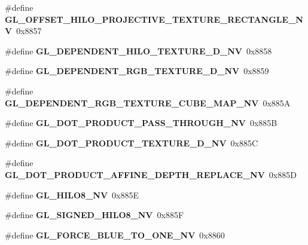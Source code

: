 \begin{DoxyCompactItemize}
\item 
\#define {\bfseries G\+L\+\_\+\+O\+F\+F\+S\+E\+T\+\_\+\+H\+I\+L\+O\+\_\+\+P\+R\+O\+J\+E\+C\+T\+I\+V\+E\+\_\+\+T\+E\+X\+T\+U\+R\+E\+\_\+\+R\+E\+C\+T\+A\+N\+G\+L\+E\+\_\+\+N\+V}~0x8857\label{_s_d_l__opengl_8h_ac6168ab85ff8ca2b666750781a2b4584}

\item 
\#define {\bfseries G\+L\+\_\+\+D\+E\+P\+E\+N\+D\+E\+N\+T\+\_\+\+H\+I\+L\+O\+\_\+\+T\+E\+X\+T\+U\+R\+E\+\_\+D\+\_\+\+N\+V}~0x8858\label{_s_d_l__opengl_8h_ac807d06fb2e5e3a201e61c96e548dd96}

\item 
\#define {\bfseries G\+L\+\_\+\+D\+E\+P\+E\+N\+D\+E\+N\+T\+\_\+\+R\+G\+B\+\_\+\+T\+E\+X\+T\+U\+R\+E\+\_\+D\+\_\+\+N\+V}~0x8859\label{_s_d_l__opengl_8h_a6d8e9d9c65f230d02084520861025af2}

\item 
\#define {\bfseries G\+L\+\_\+\+D\+E\+P\+E\+N\+D\+E\+N\+T\+\_\+\+R\+G\+B\+\_\+\+T\+E\+X\+T\+U\+R\+E\+\_\+\+C\+U\+B\+E\+\_\+\+M\+A\+P\+\_\+\+N\+V}~0x885\+A\label{_s_d_l__opengl_8h_ab764558a3e9b953cebbb17fca92cf78e}

\item 
\#define {\bfseries G\+L\+\_\+\+D\+O\+T\+\_\+\+P\+R\+O\+D\+U\+C\+T\+\_\+\+P\+A\+S\+S\+\_\+\+T\+H\+R\+O\+U\+G\+H\+\_\+\+N\+V}~0x885\+B\label{_s_d_l__opengl_8h_a0b09d6599a6e9407f384a604846af3fa}

\item 
\#define {\bfseries G\+L\+\_\+\+D\+O\+T\+\_\+\+P\+R\+O\+D\+U\+C\+T\+\_\+\+T\+E\+X\+T\+U\+R\+E\+\_\+D\+\_\+\+N\+V}~0x885\+C\label{_s_d_l__opengl_8h_ac67bd7dbb1176479222329103f6ca129}

\item 
\#define {\bfseries G\+L\+\_\+\+D\+O\+T\+\_\+\+P\+R\+O\+D\+U\+C\+T\+\_\+\+A\+F\+F\+I\+N\+E\+\_\+\+D\+E\+P\+T\+H\+\_\+\+R\+E\+P\+L\+A\+C\+E\+\_\+\+N\+V}~0x885\+D\label{_s_d_l__opengl_8h_a68f68110b2934489245e5026f2448ca6}

\item 
\#define {\bfseries G\+L\+\_\+\+H\+I\+L\+O8\+\_\+\+N\+V}~0x885\+E\label{_s_d_l__opengl_8h_a266aacf166961b07951793518f37c823}

\item 
\#define {\bfseries G\+L\+\_\+\+S\+I\+G\+N\+E\+D\+\_\+\+H\+I\+L\+O8\+\_\+\+N\+V}~0x885\+F\label{_s_d_l__opengl_8h_aaab9d98225d4c8629e41083d92f06bd9}

\item 
\#define {\bfseries G\+L\+\_\+\+F\+O\+R\+C\+E\+\_\+\+B\+L\+U\+E\+\_\+\+T\+O\+\_\+\+O\+N\+E\+\_\+\+N\+V}~0x8860\label{_s_d_l__opengl_8h_a0b2c27fea042d07fd5203ffb0f046bdc}


\end{DoxyCompactItemize}
